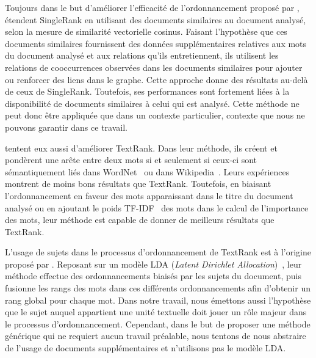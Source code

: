     Toujours dans le but d'améliorer l'efficacité de l'ordonnancement proposé
    par ,  étendent
    SingleRank en utilisant des documents similaires au document analysé, selon
    la mesure de similarité vectorielle cosinus. Faisant l'hypothèse que ces
    documents similaires fournissent des données supplémentaires relatives aux
    mots du document analysé et aux relations qu'ils entretiennent, ils
    utilisent les relations de cooccurrences observées dans les documents
    similaires pour ajouter ou renforcer des liens dans le graphe. Cette
    approche donne des résultats au-delà de ceux de SingleRank. Toutefois, ses
    performances sont fortement liées à la disponibilité de documents similaires
    à celui qui est analysé. Cette méthode ne peut donc être appliquée que dans
    un contexte particulier, contexte que nous ne pouvons garantir dans ce
    travail.

     tentent eux aussi d'améliorer
    TextRank. Dans leur méthode, ils créent et pondèrent une arête entre deux
    mots si et seulement si ceux-ci sont sémantiquement liés dans
    WordNet~\cite{miller1995wordnet} ou dans
    Wikipedia~\cite{milne2008wikipediasemanticrelatedness}. Leurs expériences
    montrent de  moins bons résultats que TextRank. Toutefois, en biaisant
    l'ordonnancement en faveur des mots apparaissant dans le titre du document
    analysé ou en ajoutant le poids TF-IDF~\cite{jones1972tfidf} des mots dans
    le calcul de l'importance des mots, leur méthode est capable de donner de
    meilleurs résultats que TextRank.

    L'usage de sujets dans le processus d'ordonnancement de TextRank est à
    l'origine proposé par . Reposant sur un
    modèle LDA (\textit{Latent Dirichlet Allocation})~\cite{blei2003lda}, leur méthode
    effectue des ordonnancements biaisés par les sujets du document, puis
    fusionne les rangs des mots dans ces différents ordonnancements afin
    d'obtenir un rang global pour chaque mot. Dans notre travail, nous émettons
    aussi l'hypothèse que le sujet auquel appartient une unité textuelle doit
    jouer un rôle majeur dans le processus d'ordonnancement. Cependant, dans le
    but de proposer une méthode générique qui ne requiert aucun travail
    préalable, nous tentons de nous abstraire de l'usage de documents
    supplémentaires et n'utilisons pas le modèle LDA.

